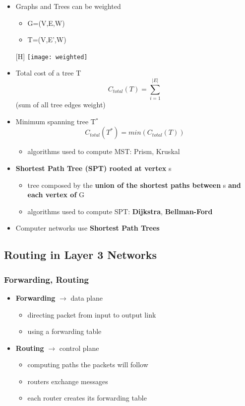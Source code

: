 \documentclass[../resumosRCOM.tex]{subfiles}
\begin{document}
\begin{itemize}
    \item Graphs and Trees can be weighted
    \begin{itemize}
        \item G=(V,E,W)
        \item T=(V,E',W)
    \end{itemize}
    \begin{center}[H]
        \texttt{[image: weighted]}
    \end{center}
    \item Total cost of a tree T \[C_{total}(T) = \sum_{i=1}^{|E|}\] (sum of all tree edges weight)
    \item Minimum spanning tree T$^*$ \[C_{total}(T^*) = min(C_{total}(T))\]
    \begin{itemize}
        \item algorithms used to compute MST: Prism, Kruskal
    \end{itemize}
    \item \textbf{Shortest Path Tree (SPT) rooted at vertex} s
    \begin{itemize}
        \item tree composed by the \textbf{union of the shortest paths between} s \textbf{and each vertex of} G
        \item algorithms used to compute SPT: \textbf{Dijkstra}, \textbf{Bellman-Ford}
    \end{itemize}
    \item Computer networks use \textbf{Shortest Path Trees}
\end{itemize}

\subsection{Routing in Layer 3 Networks}

\subsubsection{Forwarding, Routing}

\begin{itemize}
    \item \textbf{Forwarding} $\rightarrow$ data plane
    \begin{itemize}
        \item directing packet from input to output link
        \item using a forwarding table
    \end{itemize}
    \item \textbf{Routing} $\rightarrow$ control plane
    \begin{itemize}
        \item computing paths the packets will follow
        \item routers exchange messages
        \item each router creates its forwarding table
    \end{itemize}
\end{itemize}
\end{document}
